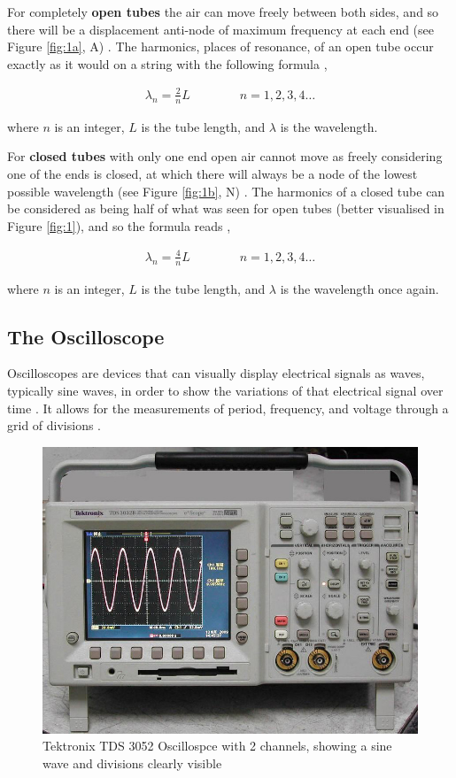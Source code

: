 \documentclass[12pt]{article}
\begin{document}
For completely \textbf{open tubes} the air can move freely between both sides, and so there will be a displacement anti-node of maximum frequency at each end (see Figure \ref{fig:1a}, A) \cite{tuberes}.
The harmonics, places of resonance, of an open tube occur exactly as it would on a string with the following formula \cite{UCDoscilloscope,tuberes},

\vspace{-2ex}
\begin{gather}
    \lambda_n = \frac{2}{n}L \qquad\qquad n=1,2,3,4 \dotsc
\end{gather}

where $n$ is an integer, $L$ is the tube length, and $\lambda$ is the wavelength.

For \textbf{closed tubes} with only one end open air cannot move as freely considering one of the ends is closed, at which there will always be a node of the lowest possible wavelength (see Figure \ref{fig:1b}, N) \cite{tuberes}.
The harmonics of a closed tube can be considered as being half of what was seen for open tubes (better visualised in Figure \ref{fig:1}), and so the formula reads \cite{UCDoscilloscope,tuberes},

\vspace{-2ex}
\begin{gather} \label{eq:3}
    \lambda_n = \frac{4}{n}L \qquad\qquad n=1,2,3,4 \dotsc
\end{gather}

where $n$ is an integer, $L$ is the tube length, and $\lambda$ is the wavelength once again.

\subsection{The Oscilloscope}

Oscilloscopes are devices that can visually display electrical signals as waves, typically sine waves, in order to show the variations of that electrical signal over time
\cite{flukeoscillo,keyoscillo,oscil101}. It allows for the measurements of period, frequency, and voltage through a grid of divisions \cite{oscil101}.

\begin{figure}[H]
    \centering
    \includegraphics[width=.6\textwidth]{tektronix tds3052.jpg}
    \caption{\centering \footnotesize{Tektronix TDS 3052 Oscillospce with 2 channels, showing a sine wave and divisions clearly visible \protect\cite{tektronixtds3052}}}
    \label{fig:2}
\end{figure}
\end{document}
